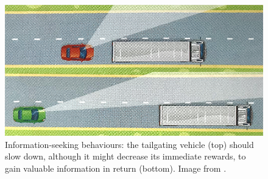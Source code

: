 \begin{figure}
	\centering
	\includegraphics[width=0.7\linewidth]{img/pomdp}
	\caption{Information-seeking behaviours: the tailgating vehicle (top) should slow down, although it might decrease its immediate rewards, to gain valuable information in return (bottom). Image from \citep{ObjCode2017}.}
	\label{fig:information-seeking}
\end{figure}

